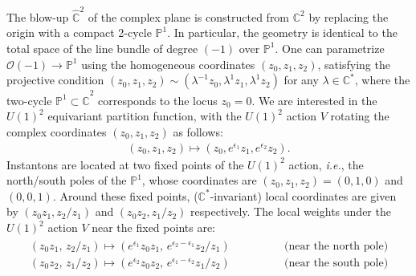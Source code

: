 \documentclass[letterpaper, 11pt]{article}
\def\IC{\mathbb{C}}
\def\IP{\mathbb{P}}
\def\e{\epsilon}
\begin{document}
The blow-up $\hat{\IC}^2$ of the complex plane is constructed from $\IC^2$ by replacing the origin with a compact 2-cycle $\IP^1$. In particular, the geometry is identical to the total space of the line bundle of degree $(-1)$ over $\IP^1$. One can parametrize $\mathcal{O}(-1)\rightarrow \IP^1$ using the homogeneous coordinates $(z_0, z_1, z_2)$, satisfying the projective condition $(z_0, z_1, z_2) \sim (\lambda^{-1}z_0, \lambda^1 z_1, \lambda^1 z_2)$ for any $\lambda \in \IC^*$, where the two-cycle  $\IP^1 \subset \hat{\IC}^2$ corresponds to the locus $z_0 = 0$. 
We are interested in the $U(1)^2$ equivariant partition function, with the $U(1)^2$ action $V$ rotating the complex coordinates $(z_0, z_1, z_2)$ as follows:
\begin{align}
  (z_0, z_1, z_2) \mapsto (z_0, e^{\e_1}z_1, e^{\e_2}z_2).
\end{align}
Instantons are located at two fixed points of the $U(1)^2$ action, \textit{i.e.}, the north/south poles of the $\mathbb{P}^1$, whose coordinates are 
$(z_0, z_1, z_2)  = (0,1,0)$ and $(0,0,1)$. Around these fixed points, ($\IC^*$-invariant) local coordinates are given by $(z_0 z_1, z_2/z_1)$ and $(z_0 z_2, z_1/z_2)$ respectively. The local weights under the $U(1)^2$ action $V$ near the fixed points are:
\begin{align}
\begin{split}
  (z_0 z_1,\,z_2/z_1) \mapsto  (e^{\e_1}z_0 z_1, \,e^{\e_2 - \e_1}z_2/z_1) & \qquad \qquad \text{(near the north pole)}\\
  (z_0 z_2,\,z_1/z_2) \mapsto (e^{\e_2}z_0 z_2, \,e^{\e_1 - \e_2}z_1/z_2) &  \qquad \qquad \text{(near the south pole)}
\end{split}
\end{align}
\end{document}

